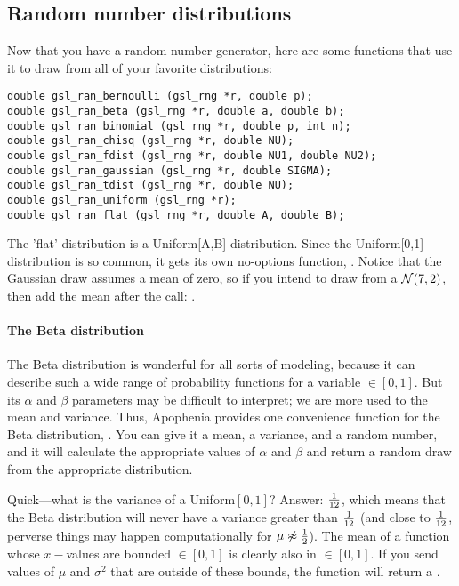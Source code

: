 \subsection{Random number distributions}
Now that you have a random number generator, here are some functions that use it to draw from all of your favorite distributions:
  
 
   

\begin{lstlisting}
double gsl_ran_bernoulli (gsl_rng *r, double p);
double gsl_ran_beta (gsl_rng *r, double a, double b);
double gsl_ran_binomial (gsl_rng *r, double p, int n);
double gsl_ran_chisq (gsl_rng *r, double NU);
double gsl_ran_fdist (gsl_rng *r, double NU1, double NU2);
double gsl_ran_gaussian (gsl_rng *r, double SIGMA);
double gsl_ran_tdist (gsl_rng *r, double NU);
double gsl_ran_uniform (gsl_rng *r);
double gsl_ran_flat (gsl_rng *r, double A, double B);
\end{lstlisting}

The 'flat' distribution is a Uniform[A,B] distribution. Since the
Uniform[0,1] distribution is so common, it gets its own no-options
function, . Notice that the Gaussian draw
assumes a mean of zero, so if you intend to draw from a ${\cal N}(7,2)$,
then add the mean after the call: .

\paragraph{The Beta distribution}\label{beta}
The Beta distribution is wonderful for all sorts of modeling, because
it can describe such a wide range of probability functions for a
variable $\in [0,1]$.  But its $\alpha$ and $\beta$ parameters may be
difficult to interpret; we are more used to the mean and variance. Thus,
Apophenia provides one convenience function for the Beta distribution,
. You can give it a mean, a variance, and
a random number, and it will calculate the appropriate values of $\alpha$
and $\beta$ and return a random draw from the appropriate distribution.

Quick---what is the variance of a Uniform$[0,1]$? Answer: ${1\over 12}$,
which means that the Beta distribution will never have a variance greater
than ${1\over 12}$ (and close to ${1\over 12}$, perverse things may
happen computationally for $\mu \not\approx {1\over 2}$). The mean of a
function whose $x-$values are bounded $\in[0,1]$ is clearly also in
$\in[0,1]$. If you send  values of $\mu$
and $\sigma^2$ that are outside of these bounds, the function will
return a .


